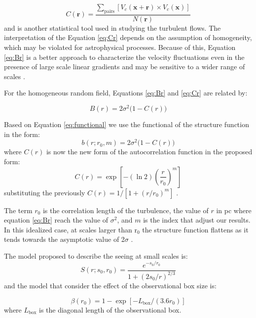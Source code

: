 \documentclass[fleqn,usenatbib, useAMS, a4paper]{mnras}
\begin{document}
\begin{equation}\label{eq:Cr}
C(\boldsymbol{r}) = \dfrac{\sum_{\text{pairs}}[V_{c}(\boldsymbol{x} + \boldsymbol{r}) \times V_{c}(\boldsymbol{x}) ]} {N(\boldsymbol{r})}
\end{equation}
%
and is another statistical tool used in studying the turbulent flows.
The interpretation of the Equation \ref{eq:Cr} depends on the assumption of homogeneity, which may be violated for astrophysical processes.
Because of this, Equation \ref{eq:Br} is a better approach to characterize the velocity fluctuations even in the presence of large scale linear gradients and may be sensitive to a wider range of scales \citep{1984ApJ...277..556S}.

For the homogeneous random field, Equations \ref{eq:Br} and \ref{eq:Cr} are related by:

\begin{equation}\label{eq:functional}
B(r) = 2\sigma^2 \bigl( 1 - C(r) \bigr)
\end{equation}

Based on Equation \ref{eq:functional} we use the functional of the structure function in the form:
%
\begin{equation}\label{eq:ff}
b(r; r_0, m) = 2\sigma^2 \bigl( 1 - C(r) \bigr)
\end{equation}
%
where $C(r)$ is now the new form of the autocorrelation function in the proposed form:
%
\begin{equation}\label{eq:ffnew}
  C(r) = \exp \left[ -(\ln 2) \left( \frac{r}{r_0} \right)^m \right]
\end{equation}
%
substituting the previously $C(r)=1/[1+(r/r_{0})^{m}]$ \citep{1966igd..book.....K,1984ApJ...277..556S}.

The term $r_{0}$ is the correlation length of the turbulence, the value of \(r\) in pc where equation \ref{eq:Br} reach the value of \(\sigma^2\), and $m$ is the index that adjust our results.
In this idealized case, at scales larger than r$_{0}$ the structure function flattens as it tends towards the asymptotic value of 2$\sigma$ \citep{arthur2016turbulence}.

The model proposed to describe the seeing at small scales is:
%
\begin{equation}\label{eq:ffs}
  S(r; s_0, r_0) = \frac{
    e^{-s_0 / r_0}
  }{
    1+(2s_0 / r)^{2 / 3}
  }
\end{equation}
%
and the model that consider the effect of the observational box size is:

\begin{equation}\label{eq:ffb}
  \beta(r_0) = 1 - \exp \left[ -L_{\text{box}} / (3.6 r_0) \right] 
\end{equation}
%
where $L_{\text{box}}$ is the diagonal length of the observational box.
\end{document}
